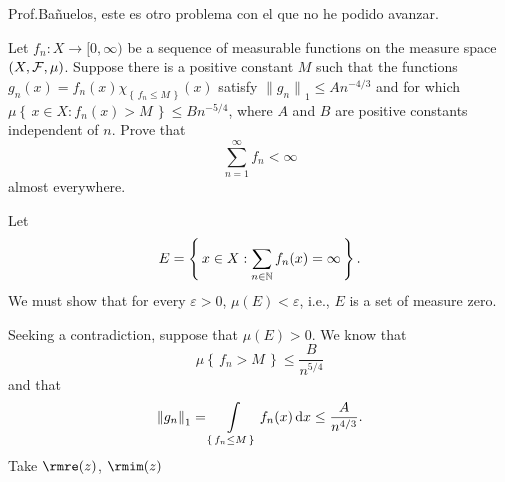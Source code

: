 \documentclass[12pt,twoside]{article}
\renewcommand*{\thefootnote}{\fnsymbol{footnote}}
\begin{document}
\renewcommand*{\thefootnote}{\fnsymbol{footnote}}

\thispagestyle{empty}
\author{\href{mailto:\email}{\auth}}
\title{\tight}
\date{\today}
\maketitle

Prof.\@ Bañuelos, este es otro problema con el que no he podido avanzar.
\begin{problem}
  Let $f_n\colon X\to[0,\infty)$ be a sequence of measurable functions on
  the measure space $(X,\mathcal{F},\mu)$. Suppose there is a positive constant
  $M$ such that the functions
  $g_n(x)=f_n (x)\chi_{\left\{\,f_n\leq M\,\right\}}(x)$ satisfy
  ${\|g_n\|}_1\leq An^{-4/3}$ and for which
  $\mu\left\{\,x\in X:f_n(x)>M\,\right\}\leq Bn^{-5/4}$, where $A$ and $B$
  are positive constants independent of $n$. Prove that
  \[
    \sum_{n=1}^\infty f_n<\infty
  \]
  almost everywhere.
\end{problem}
\begin{solution}
  Let
  \[
    E=\left\{\,x\in X:\sum_{n\in\mathbb{N}} f_n(x)=\infty\,\right\}.
  \]
  We must show that for every $\varepsilon>0$, $\mu(E)<\varepsilon$, i.e.,
  $E$ is a set of measure zero.

  Seeking a contradiction, suppose that $\mu(E)>0$. We know that
  \[
    \mu\left\{\,f_n>M\,\right\}\leq\frac{B}{n^{5/4}}
  \]
  and that
  \[
    {\|g_n\|}_1=\int\limits_{\left\{\,f_n\leq M\,\right\}}
    f_n(x)\mathop{}\!\mathrm{d} x\leq\frac{A}{n^{4/3}}.
  \]
  Take $\rmre(z)$, $\rmim(z)$
\end{solution}
\end{document}
